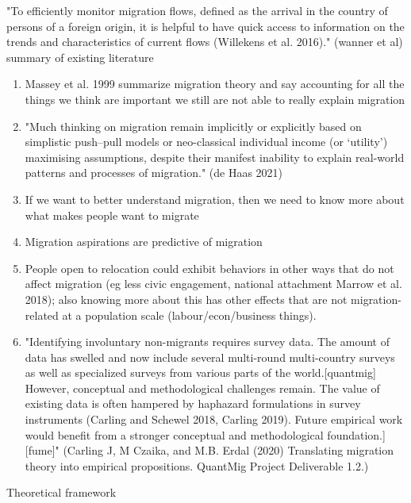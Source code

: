 "To efficiently monitor migration flows, defined as the arrival in the country of persons
of a foreign origin, it is helpful to have quick access to information on the trends and
characteristics of current flows (Willekens et al. 2016)." (wanner et al)
summary of existing literature
\begin{enumerate}
	\item Massey et al. 1999 summarize migration theory and say accounting for all the things we think are important we still are not able to really explain migration
	\item "Much thinking on migration remain implicitly or explicitly based on simplistic push–pull models or neo-classical individual income (or ‘utility’) maximising assumptions, despite their manifest inability to explain real-world patterns and processes of migration." (de Haas 2021)
	\item If we want to better understand migration, then we need to know more about what makes people want to migrate
	\item Migration aspirations are predictive of migration
	\item People open to relocation could exhibit behaviors in other ways that do not affect migration (eg less civic engagement, national attachment Marrow et al. 2018); also knowing more about this has other effects that are not migration-related at a population scale (labour/econ/business things).
	\item "Identifying involuntary non-migrants requires survey data. The amount of data has swelled and now include several multi-round multi-country surveys as well as specialized surveys from various parts of the world.[quantmig] However, conceptual and methodological challenges remain. The value of existing data is often hampered by haphazard formulations in survey instruments (Carling and Schewel 2018, Carling 2019). Future empirical work would benefit from a stronger conceptual and methodological foundation.][fume]" (Carling J, M Czaika, and M.B. Erdal (2020) Translating migration theory into empirical propositions. QuantMig Project Deliverable 1.2.)
\end{enumerate}
Theoretical framework
